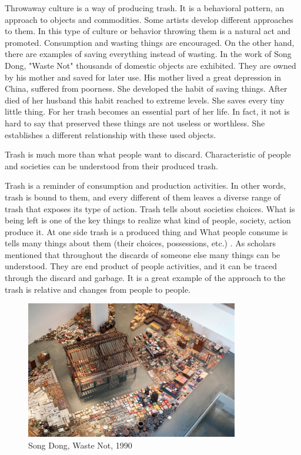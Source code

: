 Throwaway culture is a way of producing trash. It is a behavioral pattern, an approach to objects and commodities. Some artists develop different approaches to them. In this type of culture or behavior throwing them is a natural act and promoted. Consumption and wasting things are encouraged. On the other hand, there are examples of saving everything instead of wasting. In the work of Song Dong, "Waste Not" thousands of domestic objects are exhibited. They are owned by his mother and saved for later use. His mother lived a great depression in China, suffered from poorness. She developed the habit of saving things. After died of her husband this habit reached to extreme levels. She saves every tiny little thing. For her trash becomes an essential part of her life. In fact, it not is hard to say that preserved these things are not useless or worthless. She establishes a different relationship with these used objects.





%
%
Trash is much more than what people want to discard. Characteristic of people and societies can be understood from their produced trash.


Trash is a reminder of consumption and production activities. In other words, trash is bound to them, and every different of them leaves a diverse range of trash that exposes its type of action. Trash tells about societies choices. What is being left is one of the key things to realize what kind of people, society, action produce it. At one side trash is a produced thing and  What people consume is tells many things about them (their choices, possessions, etc.) . As scholars mentioned that throughout the discards of someone else many things can be understood. They are end product of people activities, and it can be traced through the discard and garbage. It is a great example of the approach to the trash is relative and changes from people to people.

\begin{figure}[h!]
  \centering
  \includegraphics[height=6cm]{graphics/SongDong_WasteNot.jpg}
  \caption{Song Dong, Waste Not, 1990}
  \label{fig:SongDong_WasteNot}
\end{figure}

